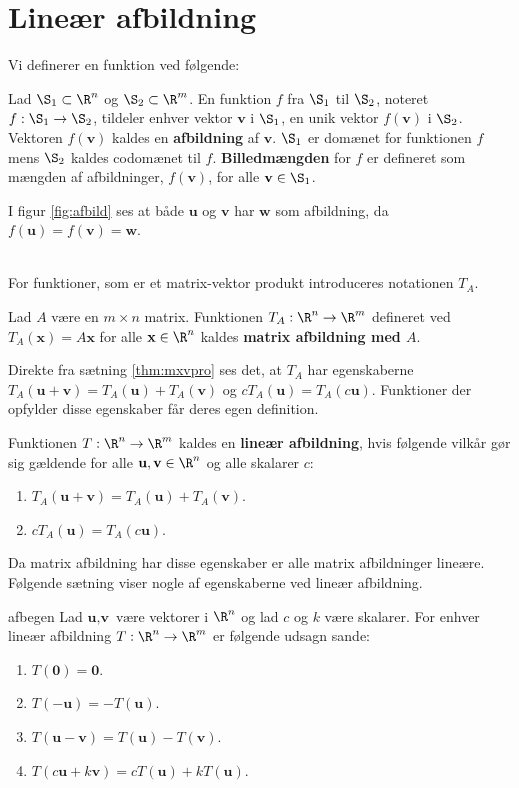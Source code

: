 \section{Lineær afbildning}
%
Vi definerer en funktion ved følgende:
%
\begin{defn}{}{}
Lad $\S _1 \subset \R^n$ og $\S _2 \subset \R^m$.
En funktion $f$ fra $\S_1$ til $\S_2$, noteret $f:\S_1\rightarrow\S_2$, tildeler enhver vektor $\textbf{v}$ i $\S_1$, en unik vektor $f(\textbf{v})$ i $\S_2$.
Vektoren $f(\textbf{v})$ kaldes en \textbf{afbildning} af $\textbf{v}$.
$\S_1$ er domænet for funktionen $f$ mens $\S_2$ kaldes codomænet til $f$.
\textbf{Billedmængden} for $f$ er defineret som mængden af afbildninger, $f(\textbf{v})$, for alle $\textbf{v}\in \S_1$.
\end{defn}\noindent
%
I figur \ref{fig:afbild} ses at både $\textbf{u}$ og $\textbf{v}$ har $\textbf{w}$ som afbildning, da $f(\textbf{u})=f(\textbf{v})=\textbf{w}$.

%
\\
For funktioner, som er et matrix-vektor produkt introduceres notationen $T_A$.
%
\begin{defn}{}{}
Lad $A$ være en $m \times n$ matrix.
Funktionen $T_A:\R^n \rightarrow \R^m$ defineret ved $T_A(\textbf{x}) = A\textbf{x}$ for alle $\textbf{x} \in \R^n$ kaldes \textbf{matrix afbildning med $A$}.
\end{defn}\noindent
%
Direkte fra sætning \ref{thm:mxvpro} ses det, at $T_A$ har egenskaberne $T_A(\textbf{u}+\textbf{v})=T_A(\textbf{u}) + T_A(\textbf{v})$ og $cT_A(\textbf{u}) = T_A(c\textbf{u})$.
Funktioner der opfylder disse egenskaber får deres egen definition.
%
\begin{defn}{}{}
Funktionen $T: \R^n \rightarrow \R^m$ kaldes en \textbf{lineær afbildning}, hvis følgende vilkår gør sig gældende for alle $\textbf{u},\textbf{v} \in \R^n$ og alle skalarer $c$:
\begin{enumerate}[label=(\alph*)]
\item $T_A(\textbf{u}+\textbf{v})=T_A(\textbf{u}) + T_A(\textbf{v})$.
\item $cT_A(\textbf{u}) = T_A(c\textbf{u})$.
\end{enumerate}
\end{defn}\noindent
%
Da matrix afbildning har disse egenskaber er alle matrix afbildninger lineære.
Følgende sætning viser nogle af egenskaberne ved lineær afbildning.
%
\begin{thm}{}{afbegen}
Lad $\textbf{u}, \textbf{v}$ være vektorer i $\R^n$ og lad $c$ og $k$ være skalarer.
For enhver lineær afbildning $T: \R^n \rightarrow \R^m$ er følgende udsagn sande:
\begin{enumerate}[label = (\alph*)]
\item $T(\textbf{0}) = \textbf{0}$.
\item $T(-\textbf{u}) = -T(\textbf{u})$.
\item $T(\textbf{u}-\textbf{v}) = T(\textbf{u})-T(\textbf{v})$.
\item $T(c\textbf{u} + k\textbf{v}) = cT(\textbf{u}) + kT(\textbf{u})$.
\end{enumerate}
\end{thm}
